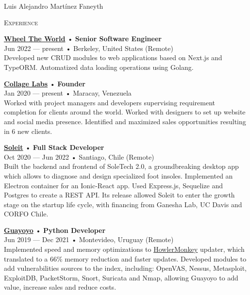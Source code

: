 \documentclass[12pt]{article}
\begin{document}
\begin{cv}{Luis Alejandro Mart\'inez Faneyth}
\begin{minipage}[t]{0.55\textwidth}
    \textrm{\textsc{\Large{Experience}}}
    \newline
    \parbox[t]{\linewidth}{
      \textbf{\href{https://wheeltheworld.com}{Wheel The World}} • \textrm{\textbf{Senior Software Engineer}}\\
      Jun 2022 --- present • Berkeley, United States (Remote)\\
      \footnotesize{Developed new CRUD modules to web applications based on Next.js and TypeORM. Automatized data loading operations using Golang.}\\
    }\vspace{0.125em}
    \parbox[t]{\linewidth}{
      \textbf{\href{https://collagelabs.org}{Collage Labs}} • \textrm{\textbf{Founder}}\\
      Jan 2020 --- present • Maracay, Venezuela\\
      \footnotesize{Worked with project managers and developers supervising requirement completion for clients around the world. Worked with designers to set up website and social media presence. Identified and maximized sales opportunities resulting in 6 new clients.}\\
    }\vspace{0.125em}
    \parbox[t]{\linewidth}{
      \textbf{\href{https://soleit.app}{Soleit}} • \textrm{\textbf{Full Stack Developer}}\\
      Oct 2020 --- Jun 2022 • Santiago, Chile (Remote)\\
      \footnotesize{Built the backend and frontend of SoleTech 2.0, a groundbreaking desktop app which allows to diagnose and design specialized foot insoles. Implemented an Electron container for an Ionic-React app. Used Express.js, Sequelize and Postgres to create a REST API. Its release allowed Soleit to enter the growth stage on the startup life cycle, with financing from Ganesha Lab, UC Davis and CORFO Chile.}\\
    }\vspace{0.125em}
    \parbox[t]{\linewidth}{
      \textbf{\href{https://guayoyo.io}{Guayoyo}} • \textrm{\textbf{Python Developer}}\\
      Jun 2019 --- Dec 2021 • Montevideo, Uruguay (Remote)\\
      \footnotesize{Implemented speed and memory optimizations to \href{https://howlermonkey.io}{HowlerMonkey} updater, which translated to a 66\% memory reduction and faster updates. Developed modules to add vulnerabilities sources to the index, including: OpenVAS, Nessus, Metasploit, ExploitDB, PacketStorm, Snort, Suricata and Nmap, allowing Guayoyo to add value, increase sales and reduce costs.}\\
}
\end{minipage}
\end{cv}
\end{document}
